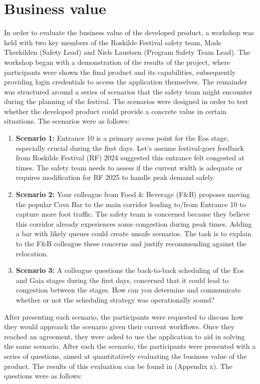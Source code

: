 \section{Business value}
\label{sec:business-value}

In order to evaluate the business value of the developed product, a workshop was held with two key members of the Roskilde Festival safety team, Mads Therkilden (Safety Lead) and Niels Laustsen (Program Safety Team Lead). The workshop began with a demonstration of the results of the project, where participants were shown the final product and its capabilities, subsequently providing login credentials to access the application themselves. The remainder was structured around a series of scenarios that the safety team might encounter during the planning of the festival. The scenarios were designed in order to test whether the developed product could provide a concrete value in certain situations. The scenarios were as follows:

\begin{enumerate}
  \item \textbf{Scenario 1:} Entrance 10 is a primary access point for the Eos stage, especially crucial during the first days. Let's assume festival-goer feedback from Roskilde Festival (RF) 2024 suggested this entrance felt congested at times. The safety team needs to assess if the current width is adequate or requires modification for RF 2025 to handle peak demand safely.
  \item \textbf{Scenario 2:} Your colleague from Food \& Beverage (F\&B) proposes moving the popular Cava Bar to the main corridor leading to/from Entrance 10 to capture more foot traffic. The safety team is concerned because they believe this corridor already experiences some congestion during peak times. Adding a bar with likely queues could create unsafe scenarios. The task is to explain to the F\&B colleague these concerns and justify recommending against the relocation.
  \item \textbf{Scenario 3:} A colleague questions the back-to-back scheduling of the Eos and Gaia stages during the first days, concerned that it could lead to congestion between the stages. How can you determine and communicate whether or not the scheduling strategy was operationally sound?
\end{enumerate}

After presenting each scenario, the participants were requested to discuss how they would approach the scenario given their current workflows. Once they reached an agreement, they were asked to use the application to aid in solving the same scenario. After each the scenario, the participants were presented with a series of questions, aimed at quantitatively evaluating the business value of the product. The results of this evaluation can be found in (Appendix x). The questions were as follows:

